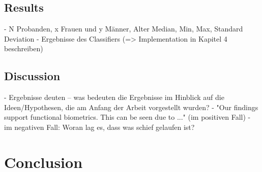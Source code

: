 \subsection{Results}
- N Probanden, x Frauen und y Männer, Alter Median, Min, Max, Standard Deviation
- Ergebnisse des Classifiers (=> Implementation in Kapitel 4 beschreiben)

\subsection{Discussion}

- Ergebnisse deuten -- was bedeuten die Ergebnisse im Hinblick auf die Ideen/Hypothesen, die am Anfang der Arbeit vorgestellt wurden?
- "Our findings support functional biometrics. This can be seen due to ..." (im positiven Fall)
- im negativen Fall: Woran lag es, dass was schief gelaufen ist?


\section{Conclusion}
